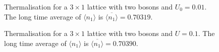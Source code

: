 \documentclass[prb, twocolumn, final]{revtex4-1}
\theoremstyle{plain}
\begin{document}
\begin{figure}[H]
     \caption{Thermalisation for a $3\times 1$ lattice with two bosons and
              $U_{0} = 0.01$. The long time average of $\langle n_1 \rangle$ is
              $\overline{\langle n_1 \rangle}=0.70319.$}
\end{figure}

\begin{figure}[H]
     \caption{Thermalisation for a $3\times 1$ lattice with two bosons and $U =
              0.1$. The long time average of $\langle n_1 \rangle$ is
              $\overline{\langle n_1 \rangle}=0.70390.$}
\end{figure}
\end{document}
